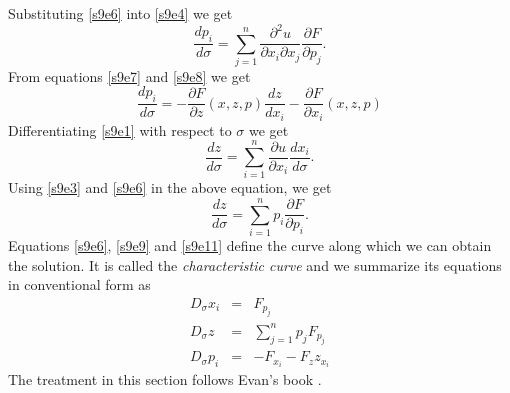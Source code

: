 \documentclass{article}
\newcommand{\td}[2]{\frac{d{#1}}{d{#2}}}
\newcommand{\pd}[2]{\frac{\partial{#1}}{\partial{#2}}}
\theoremstyle{plain}
\numberwithin{thm}{section}
\theoremstyle{plain}
\numberwithin{prop}{section}
\theoremstyle{definition}
\numberwithin{defn}{section}
\theoremstyle{remark}
\numberwithin{equation}{section}
\begin{document}
Substituting \eqref{s9e6} into \eqref{s9e4} we get
\begin{equation}\label{s9e8}
\td{p_i}{\sigma} = \sum_{j=1}^n\frac{\partial^2 u}{\partial x_i \partial x_j}\pd{F}{p_j}.
\end{equation}
From equations \eqref{s9e7} and \eqref{s9e8} we get
\begin{equation}\label{s9e9}
\td{p_i}{\sigma} = -\pd{F}{z}(x, z, p)\td{z}{x_i} - \pd{F}{x_i}(x, z, p)
\end{equation}
Differentiating \eqref{s9e1} with respect to $\sigma$ we get
\begin{equation}\label{s9e10}
\td{z}{\sigma} = \sum_{i=1}^n\pd{u}{x_i}\td{x_i}{\sigma}.
\end{equation}
Using \eqref{s9e3} and \eqref{s9e6} in the above equation, we get
\begin{equation}\label{s9e11}
\td{z}{\sigma} = \sum_{i=1}^n p_i\pd{F}{p_i}.
\end{equation}
Equations \eqref{s9e6}, \eqref{s9e9} and \eqref{s9e11} define the curve along which we can obtain
the solution. It is called the \emph{characteristic curve} and we summarize its equations in 
conventional form as
\begin{eqnarray}
D_\sigma x_i &=& F_{p_j} \label{s9e12} \\
D_\sigma z   &=& \sum_{j=1}^n p_j F_{p_j} \label{s9e13} \\
D_\sigma p_i &=& -F_{x_i} - F_z z_{x_i} \label{s9e14}
\end{eqnarray}
The treatment in this section follows Evan's book \cite{evans}.
\end{document}
